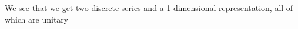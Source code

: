 \begin{enumerate}
   We see that we get two discrete series and a 1 dimensional representation, all of
   which are unitary


\end{enumerate}
